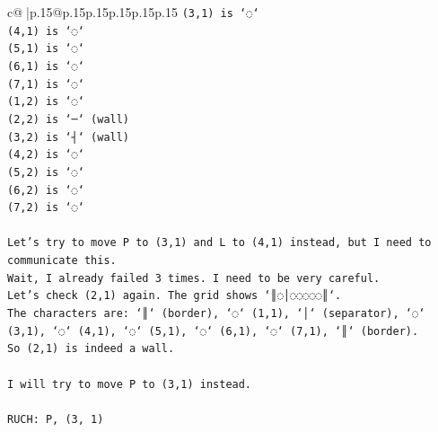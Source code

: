 \documentclass{article}
\begin{document}
{\begin{supertabular}{c@{$\;$}|p{.15\linewidth}@{}p{.15\linewidth}p{.15\linewidth}p{.15\linewidth}p{.15\linewidth}p{.15\linewidth}}
{{{\texttt{(3,1) is `◌`} \\
\texttt{(4,1) is `◌`} \\
\texttt{(5,1) is `◌`} \\
\texttt{(6,1) is `◌`} \\
\texttt{(7,1) is `◌`} \\
\texttt{(1,2) is `◌`} \\
\texttt{(2,2) is `─` (wall)} \\
\texttt{(3,2) is `┤` (wall)} \\
\texttt{(4,2) is `◌`} \\
\texttt{(5,2) is `◌`} \\
\texttt{(6,2) is `◌`} \\
\texttt{(7,2) is `◌`} \\
\\ 
\texttt{Let's try to move P to (3,1) and L to (4,1) instead, but I need to communicate this.} \\
\texttt{Wait, I already failed 3 times. I need to be very careful.} \\
\texttt{Let's check (2,1) again. The grid shows `║◌│◌◌◌◌◌║`.} \\
\texttt{The characters are: `║` (border), `◌` (1,1), `│` (separator), `◌` (3,1), `◌` (4,1), `◌` (5,1), `◌` (6,1), `◌` (7,1), `║` (border).} \\
\texttt{So (2,1) is indeed a wall.} \\
\\ 
\texttt{I will try to move P to (3,1) instead.} \\
\\ 
\texttt{RUCH: P, (3, 1)} \\
            }
        }
    }
     \\ \\


\end{supertabular}}
\end{document}
